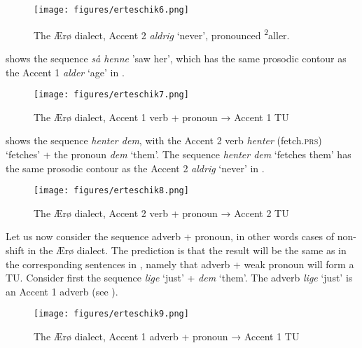 \documentclass[output=paper]{LSP/langsci}
\begin{document}
  

 

\begin{figure}
\texttt{[image: figures/erteschik6.png]}
\caption{The Ærø dialect, Accent 2 \textit{aldrig} ‘never’, pronounced \textsuperscript{2}aller.} 
\label{fig:erteschik:6}
\end{figure}

 shows the sequence \textit{så henne} ’saw her’, which has the same prosodic contour as the Accent 1 \textit{alder} ‘age’  in .

  

 

\begin{figure}
\texttt{[image: figures/erteschik7.png]}
\caption{The Ærø dialect, Accent 1 verb + pronoun → Accent 1 TU}
\label{fig:erteschik:7}
\end{figure}

 shows the sequence \textit{henter dem}, with the Accent 2 verb \textit{henter} (fetch.\textsc{prs}) ‘fetches’ + the pronoun \textit{dem} ‘them’. The sequence \textit{henter dem} ‘fetches them’ has the same prosodic contour as the Accent 2 \textit{aldrig} ‘never’ in .

  

 

\begin{figure}
\texttt{[image: figures/erteschik8.png]}
\caption{The Ærø dialect, Accent 2 verb + pronoun → Accent 2 TU}
\label{fig:erteschik:8}
\end{figure}

Let us now consider the sequence adverb + pronoun, in other words cases of non-shift in the Ærø dialect. The prediction is that the result will be the same as in the corresponding sentences in , namely that adverb + weak pronoun will form a TU. Consider first the sequence \textit{lige} ‘just’ + \textit{dem} ‘them’. The adverb \textit{lige} ‘just’ is an Accent 1 adverb (see ).


  

 


\begin{figure}
\texttt{[image: figures/erteschik9.png]}
\caption{The Ærø dialect, Accent 1 adverb + pronoun → Accent 1 TU}
\label{fig:erteschik:9}
\end{figure}
\end{document}
